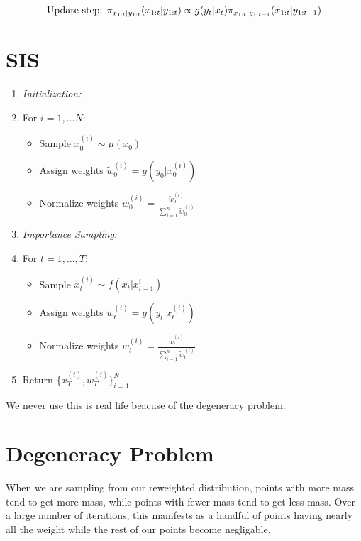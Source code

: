 \documentclass{article}
\begin{document}
\begin{equation}
\textnormal{Update step:  }
\pi_{x_{1:t}|y_{1:t}}(x_{1:t}|y_{1:t})\propto g(y_t|x_t)\pi_{x_{1:t}|y_{1:t-1}}(x_{1:t}|y_{1:t-1})
\end{equation}

\section{SIS}
\begin{enumerate}
\item \textit{Initialization:}
\item[] For $i=1,\dots N$:
\begin{itemize}
\item[] Sample $x_0^{(i)} \sim \mu(x_0)$ 
\item[] Assign weights $\widetilde{w}_0^{(i)} = g(y_0|x_0^{(i)})$
\item[] Normalize weights $w_0^{(i)} = \frac{\widetilde{w}_0^{(i)}}{\sum_{i=1}^{n} \widetilde{w}_0^{(i)}}$
\end{itemize}
\item \textit{Importance Sampling:}
\item[] For $t=1,\dots,T$:
\begin{itemize}
\item[] Sample $x_t^{(i)} \sim f(x_t|x_{t-1}^{i})$
\item[] Assign weights $\widetilde{w}_t^{(i)} = g(y_t|x_t^{(i)})$
\item[] Normalize weights $w_t^{(i)} = \frac{\widetilde{w}_t^{(i)}}{\sum_{i=1}^{n} \widetilde{w}_t^{(i)}}$
\end{itemize}
\item Return $\{x_T^{(i)},w_T^{(i)}\}_{i=1}^N$
\end{enumerate}

We never use this is real life beacuse of the degeneracy problem.

\section{Degeneracy Problem}
When we are sampling from our reweighted distribution, points with more mass tend to get more mass, while points with fewer mass tend to get less mass. Over a large number of iterations, this manifests as a handful of points having nearly all the weight while the rest of our points become negligable. 
\end{document}
